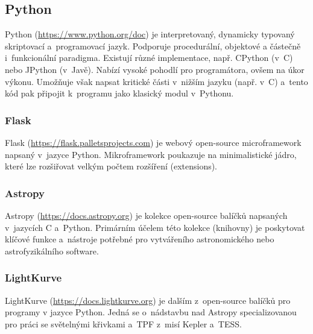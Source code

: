 \documentclass[a4paper,12pt]{article}
\begin{document}
{{{{{{{{

\subsection{Python}

Python (\url{https://www.python.org/doc}) je interpretovaný, dynamicky typovaný skriptovací a~programovací jazyk. Podporuje procedurální, objektové a částečně i~funkcionální paradigma. Existují různé implementace, např. CPython (v~C) nebo JPython (v~Javě). Nabízí vysoké pohodlí pro programátora, ovšem na úkor výkonu. Umožňuje však napsat kritické části v~nižším jazyku (např. v~C) a~tento kód pak připojit k~programu jako klasický modul v~Pythonu.~\cite{python}

\subsubsection{Flask}

Flask (\url{https://flask.palletsprojects.com}) je webový open-source microframework napsaný v~jazyce Python. Mikroframework poukazuje na minimalistické jádro, které lze rozšiřovat velkým počtem rozšíření (extensions).~\cite{flask}



\subsubsection{Astropy}

Astropy (\url{https://docs.astropy.org}) je kolekce open-source balíčků napsaných v~jazycích C a~Python. Primárním účelem této kolekce (knihovny) je poskytovat klíčové funkce a~nástroje potřebné pro vytvářeního astronomického nebo astrofyzikálního software.~\cite{astropy}



\subsubsection{LightKurve}

LightKurve (\url{https://docs.lightkurve.org}) je dalším z~open-source balíčků pro programy v jazyce Python. Jedná se o~nádstavbu nad Astropy specializovanou pro práci se světelnými křivkami a~TPF z~misí Kepler a~TESS.~\cite{lightkurve}

}}}}}}}}
\end{document}

